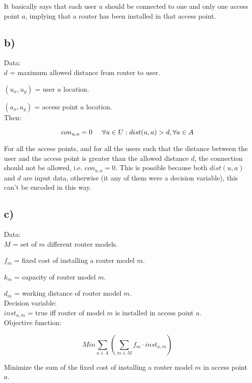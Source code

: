 \documentclass[11pt, oneside]{article}   	%
\begin{document}
It basically says that each user $u$ should be connected to one and only one access point $a$, implying that a router has been installed in that access point.

\subsection{b)}
\hspace{\parindent}Data:\\

$d$ = maximum allowed distance from router to user.

$(u_x,u_y)$ = user $u$ location.

$(a_x,a_y)$ = access point $a$ location.\\

Then:

$$ con_{u,a} = 0 \hspace{5 mm} \forall u \in U : dist(u,a) > d, \forall a \in A$$

For all the access points, and for all the users such that the distance between the user and the access point is greater than the allowed distance $d$, the connection should not be allowed, i.e. $con_{u,a} = 0$. This is possible because both $dist(u,a)$ and $d$ are input data, otherwise (it any of them were a decision variable), this can't be encoded in this way.

\subsection{c)}
\hspace{\parindent}Data:\\

$M$ =  set of $m$ different router models.

$f_m$ = fixed cost of installing a router model $m$.

$k_m$ = capacity of router model $m$.

$d_m$ = working distance of router model $m$.\\

Decision variable:\\

$inst_{a,m}$ = true iff router of model $m$ is installed in access point $a$.\\

Objective function:

$$Min \sum_{a \in A}(\sum_{m \in M} f_m \cdot inst_{a,m})$$

Minimize the sum of the fixed cost of installing a router model $m$ in access point $a$.
\end{document}
